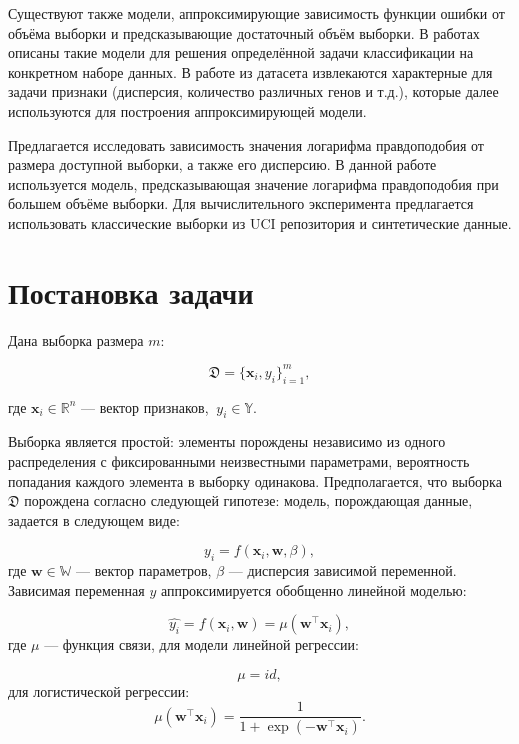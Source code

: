 \documentclass[12pt, a4paper]{scrartcl}
\theoremstyle{plain}
\theoremstyle{definition}
\begin{document}
Существуют также модели, аппроксимирующие зависимость функции ошибки от объёма выборки и предсказывающие достаточный объём выборки.  В работах \cite{Figueroa-2012, Dobbin-2008} описаны такие модели для решения определённой задачи классификации на конкретном наборе данных. В работе \cite{Dobbin-2008} из датасета извлекаются характерные для задачи признаки (дисперсия, количество различных генов и т.д.), которые далее используются для построения аппроксимирующей модели. 

Предлагается исследовать зависимость значения логарифма правдоподобия от размера доступной выборки, а также его дисперсию. В данной работе используется модель, предсказывающая значение логарифма правдоподобия при большем объёме выборки. Для вычислительного эксперимента предлагается использовать классические выборки из UCI репозитория и синтетические данные.


\newpage
\section{Постановка задачи}

Дана выборка размера $m$:

$$
\mathfrak D = \{\mathbf{x}_i, y_i\}_{i=1}^m,
$$

где $\textbf{x}_i \in \mathbb{R}^{n}$ --- вектор признаков, $~y_i \in \mathbb{Y}$.

Выборка является простой: элементы порождены независимо из одного распределения с фиксированными неизвестными параметрами, вероятность попадания каждого элемента в выборку одинакова. Предполагается, что выборка $\mathfrak D$ порождена согласно следующей гипотезе: модель, порождающая данные, задается в следующем виде:

\begin{equation}\label{f}
y_i = f(\mathbf{x}_i, \mathbf{w}, \beta),
\end{equation}
где $\textbf{w} \in \mathbb{W}$ --- вектор параметров, $\beta$ --- дисперсия зависимой переменной. Зависимая переменная $y$ аппроксимируется обобщенно линейной моделью:

\begin{equation}\label{y_f}
\hat{y_i} = f(\mathbf{x}_i, \mathbf{w}) = \mu(\mathbf{w}^{\top}\mathbf{x}_i),
\end{equation}
где $\mu$ --- функция связи, для модели линейной регрессии:

\begin{equation}\label{lin_reg_lf}
 \mu = id,
\end{equation}
для логистической регрессии:
\begin{equation}\label{log_reg_lf}
\mu(\mathbf{w}^{\top}\mathbf{x}_i) = \frac{1}{1 + \exp(-\mathbf{w}^{\top}\mathbf{x}_i)}.
\end{equation}
\end{document}

